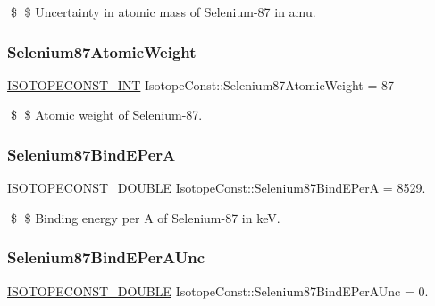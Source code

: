 \$ \$ Uncertainty in atomic mass of Selenium-\/87 in amu. \mbox{\label{group___isotope_const-_selenium-_se87_gafb610b8770290157e2038974c2f0e10c}} 
\subsubsection{\texorpdfstring{Selenium87\+Atomic\+Weight}{Selenium87AtomicWeight}}
{\footnotesize\ttfamily \mbox{\hyperlink{group___isotope_const-_macros_ga5f18360b3e99483a35c32d789e62621c}{I\+S\+O\+T\+O\+P\+E\+C\+O\+N\+S\+T\+\_\+\+I\+NT}} Isotope\+Const\+::\+Selenium87\+Atomic\+Weight = 87}

\$ \$ Atomic weight of Selenium-\/87. \mbox{\label{group___isotope_const-_selenium-_se87_gab42d7a12729e4650d895b2e3327132da}} 
\subsubsection{\texorpdfstring{Selenium87\+Bind\+E\+PerA}{Selenium87BindEPerA}}
{\footnotesize\ttfamily \mbox{\hyperlink{group___isotope_const-_macros_ga8f45a7272ce02c0b4c65c44636ed719a}{I\+S\+O\+T\+O\+P\+E\+C\+O\+N\+S\+T\+\_\+\+D\+O\+U\+B\+LE}} Isotope\+Const\+::\+Selenium87\+Bind\+E\+PerA = 8529.}

\$ \$ Binding energy per A of Selenium-\/87 in keV. \mbox{\label{group___isotope_const-_selenium-_se87_ga1de715a3572eb0ff5f319e4255e4deca}} 
\subsubsection{\texorpdfstring{Selenium87\+Bind\+E\+Per\+A\+Unc}{Selenium87BindEPerAUnc}}
{\footnotesize\ttfamily \mbox{\hyperlink{group___isotope_const-_macros_ga8f45a7272ce02c0b4c65c44636ed719a}{I\+S\+O\+T\+O\+P\+E\+C\+O\+N\+S\+T\+\_\+\+D\+O\+U\+B\+LE}} Isotope\+Const\+::\+Selenium87\+Bind\+E\+Per\+A\+Unc = 0.}

